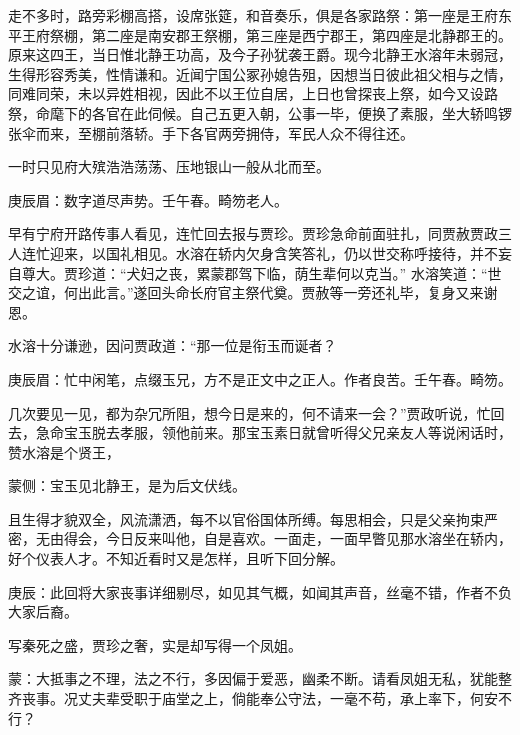 \begin{parag}
    走不多时，路旁彩棚高搭，设席张筵，和音奏乐，俱是各家路祭：第一座是王府东平王府祭棚，第二座是南安郡王祭棚，第三座是西宁郡王，第四座是北静郡王的。原来这四王，当日惟北静王功高，及今子孙犹袭王爵。现今北静王水溶年未弱冠，生得形容秀美，性情谦和。近闻宁国公冢孙媳告殂，因想当日彼此祖父相与之情，同难同荣，未以异姓相视，因此不以王位自居，上日也曾探丧上祭，如今又设路祭，命麾下的各官在此伺候。自己五更入朝，公事一毕，便换了素服，坐大轿鸣锣张伞而来，至棚前落轿。手下各官两旁拥侍，军民人众不得往还。
\end{parag}


\begin{parag}
    一时只见府大殡浩浩荡荡、压地银山一般从北而至。\begin{note}庚辰眉：数字道尽声势。壬午春。畸笏老人。\end{note}早有宁府开路传事人看见，连忙回去报与贾珍。贾珍急命前面驻扎，同贾赦贾政三人连忙迎来，以国礼相见。水溶在轿内欠身含笑答礼，仍以世交称呼接待，并不妄自尊大。贾珍道：“犬妇之丧，累蒙郡驾下临，荫生辈何以克当。” 水溶笑道：“世交之谊，何出此言。”遂回头命长府官主祭代奠。贾赦等一旁还礼毕，复身又来谢恩。
\end{parag}


\begin{parag}
    水溶十分谦逊，因问贾政道：“那一位是衔玉而诞者？\begin{note}庚辰眉：忙中闲笔，点缀玉兄，方不是正文中之正人。作者良苦。壬午春。畸笏。\end{note}几次要见一见，都为杂冗所阻，想今日是来的，何不请来一会？”贾政听说，忙回去，急命宝玉脱去孝服，领他前来。那宝玉素日就曾听得父兄亲友人等说闲话时，赞水溶是个贤王，\begin{note}蒙侧：宝玉见北静王，是为后文伏线。\end{note}且生得才貌双全，风流潇洒，每不以官俗国体所缚。每思相会，只是父亲拘束严密，无由得会，今日反来叫他，自是喜欢。一面走，一面早瞥见那水溶坐在轿内，好个仪表人才。不知近看时又是怎样，且听下回分解。
\end{parag}


\begin{parag}
    \begin{note}庚辰：此回将大家丧事详细剔尽，如见其气概，如闻其声音，丝毫不错，作者不负大家后裔。\end{note}
\end{parag}


\begin{parag}
    \begin{note}写秦死之盛，贾珍之奢，实是却写得一个凤姐。\end{note}
\end{parag}


\begin{parag}
    \begin{note}蒙：大抵事之不理，法之不行，多因偏于爱恶，幽柔不断。请看凤姐无私，犹能整齐丧事。况丈夫辈受职于庙堂之上，倘能奉公守法，一毫不苟，承上率下，何安不行？\end{note}
\end{parag}